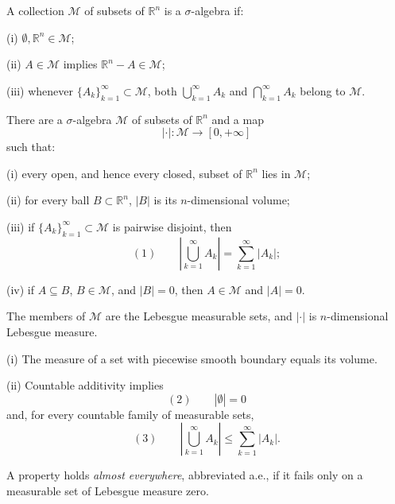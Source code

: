 \begin{definition}
\label{def:sigma-algebra}
A collection $\mathcal M$ of subsets of $\mathbb R^n$ is a $\sigma$-algebra if:

(i) $\emptyset,\mathbb R^n\in\mathcal M$;

(ii) $A\in\mathcal M$ implies $\mathbb R^n-A\in\mathcal M$;

(iii) whenever $\{A_k\}_{k=1}^\infty\subset\mathcal M$, both
$\bigcup_{k=1}^\infty A_k$ and $\bigcap_{k=1}^\infty A_k$ belong to
$\mathcal M$.
\end{definition}

\begin{theorem}
\label{thm:existence-lebesgue-measure}
There are a $\sigma$-algebra $\mathcal M$ of subsets of $\mathbb R^n$ and a map
\[
|\cdot|:\mathcal M\to[0,+\infty]
\]
such that:

(i) every open, and hence every closed, subset of $\mathbb R^n$ lies in
$\mathcal M$;

(ii) for every ball $B\subset\mathbb R^n$, $|B|$ is its $n$-dimensional
volume;

(iii) if $\{A_k\}_{k=1}^\infty\subset\mathcal M$ is pairwise disjoint, then
\[
(1)\qquad
\left|\bigcup_{k=1}^\infty A_k\right|=\sum_{k=1}^\infty|A_k|;
\]

(iv) if $A\subseteq B$, $B\in\mathcal M$, and $|B|=0$, then
$A\in\mathcal M$ and $|A|=0$.

The members of $\mathcal M$ are the Lebesgue measurable sets, and $|\cdot|$ is
$n$-dimensional Lebesgue measure.
\end{theorem}

\begin{remark}
\label{rem:lebesgue-measure-properties}
(i) The measure of a set with piecewise smooth boundary equals its volume.

(ii) Countable additivity implies
\[
(2)\qquad |\emptyset|=0
\]
and, for every countable family of measurable sets,
\[
(3)\qquad
\left|\bigcup_{k=1}^\infty A_k\right|\leq\sum_{k=1}^\infty|A_k|.
\]
\end{remark}

\begin{definition}
\label{def:almost-everywhere}
A property holds \textit{almost everywhere}, abbreviated a.e., if it fails only
on a measurable set of Lebesgue measure zero.
\end{definition}

